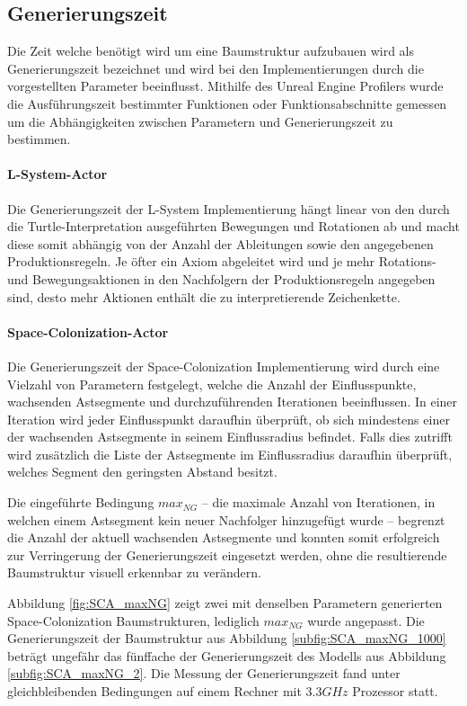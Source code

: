 \subsection{Generierungszeit}

Die Zeit welche benötigt wird um eine Baumstruktur aufzubauen wird als Generierungszeit bezeichnet und wird bei den Implementierungen durch die vorgestellten Parameter beeinflusst. Mithilfe des Unreal Engine Profilers wurde die Ausführungszeit bestimmter Funktionen oder Funktionsabschnitte gemessen um die Abhängigkeiten zwischen Parametern und Generierungszeit zu bestimmen. \cite{Profiling:15}

\paragraph{L-System-Actor}

Die Generierungszeit der L-System Implementierung hängt linear von den durch die Turtle-Interpretation ausgeführten Bewegungen und Rotationen ab und macht diese somit abhängig von der Anzahl der Ableitungen sowie den angegebenen Produktionsregeln. Je öfter ein Axiom abgeleitet wird und je mehr Rotations- und Bewegungsaktionen in den Nachfolgern der Produktionsregeln angegeben sind, desto mehr Aktionen enthält die zu interpretierende Zeichenkette. 

\paragraph{Space-Colonization-Actor}

Die Generierungszeit der Space-Colonization Implementierung wird durch eine Vielzahl von Parametern festgelegt, welche die Anzahl der Einflusspunkte, wachsenden Astsegmente und durchzuführenden Iterationen beeinflussen. In einer Iteration wird jeder Einflusspunkt daraufhin überprüft, ob sich mindestens einer der wachsenden Astsegmente in seinem Einflussradius befindet. Falls dies zutrifft wird zusätzlich die Liste der Astsegmente im Einflussradius daraufhin überprüft, welches Segment den geringsten Abstand besitzt.

Die eingeführte Bedingung $max_{NG}$ -- die maximale Anzahl von Iterationen, in welchen einem Astsegment kein neuer Nachfolger hinzugefügt wurde -- begrenzt die Anzahl der aktuell wachsenden Astsegmente und konnten somit erfolgreich zur Verringerung der Generierungszeit eingesetzt werden, ohne die resultierende Baumstruktur visuell erkennbar zu verändern. 

Abbildung \ref{fig:SCA_maxNG} zeigt zwei mit denselben Parametern generierten Space-Colo\-ni\-za\-tion Baumstrukturen, lediglich $max_{NG}$ wurde angepasst. Die Generierungszeit der Baumstruktur aus Abbildung \ref{subfig:SCA_maxNG_1000} beträgt ungefähr das fünffache der Generierungszeit des Modells aus Abbildung \ref{subfig:SCA_maxNG_2}. Die Messung der Generierungszeit fand unter gleichbleibenden Bedingungen auf einem Rechner mit $3.3GHz$ Prozessor statt. 

